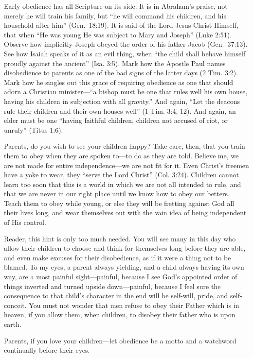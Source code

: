 \documentclass[
]{book}
\begin{document}
Early obedience has all Scripture on its side. It is in Abraham's praise, not merely he will train his family, but ``he will command his children, and his household after him'' (Gen.~18:19). It is said of the Lord Jesus Christ Himself, that when ``He was young He was subject to Mary and Joseph'' (Luke 2:51). Observe how implicitly Joseph obeyed the order of his father Jacob (Gen.~37:13). See how Isaiah speaks of it as an evil thing, when ``the child shall behave himself proudly against the ancient'' (Isa. 3:5). Mark how the Apostle Paul names disobedience to parents as one of the bad signs of the latter days (2 Tim. 3:2). Mark how he singles out this grace of requiring obedience as one that should adorn a Christian minister---``a bishop must be one that rules well his own house, having his children in subjection with all gravity.'' And again, ``Let the deacons rule their children and their own houses well'' (1 Tim. 3:4, 12). And again, an elder must be one ``having faithful children, children not accused of riot, or unruly'' (Titus 1:6).

Parents, do you wish to see your children happy? Take care, then, that you train them to obey when they are spoken to---to do as they are told. Believe me, we are not made for entire independence---we are not fit for it. Even Christ's freemen have a yoke to wear, they ``serve the Lord Christ'' (Col. 3:24). Children cannot learn too soon that this is a world in which we are not all intended to rule, and that we are never in our right place until we know how to obey our betters. Teach them to obey while young, or else they will be fretting against God all their lives long, and wear themselves out with the vain idea of being independent of His control.

Reader, this hint is only too much needed. You will see many in this day who allow their children to choose and think for themselves long before they are able, and even make excuses for their disobedience, as if it were a thing not to be blamed. To my eyes, a parent always yielding, and a child always having its own way, are a most painful sight---painful, because I see God's appointed order of things inverted and turned upside down---painful, because I feel sure the consequence to that child's character in the end will be self-will, pride, and self-conceit. You must not wonder that men refuse to obey their Father which is in heaven, if you allow them, when children, to disobey their father who is upon earth.

Parents, if you love your children---let obedience be a motto and a watchword continually before their eyes.
\end{document}
